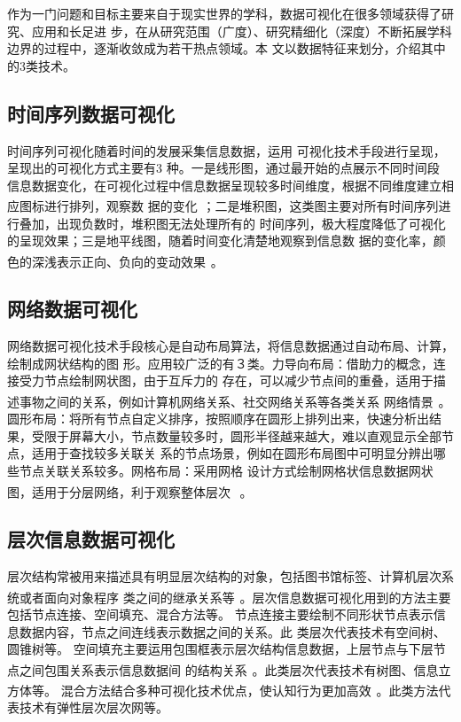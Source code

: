 \documentclass[a4paper]{article}
\begin{document}
作为一门问题和目标主要来自于现实世界的学科，数据可视化在很多领域获得了研究、应用和长足进
步，在从研究范围（广度）、研究精细化（深度）不断拓展学科边界的过程中，逐渐收敛成为若干热点领域。本
文以数据特征来划分，介绍其中的3类技术。
\subsection{时间序列数据可视化}
时间序列可视化随着时间的发展采集信息数据，运用
可视化技术手段进行呈现，呈现出的可视化方式主要有3
种。一是线形图，通过最开始的点展示不同时间段
信息数据变化，在可视化过程中信息数据呈现较多时间维度，根据不同维度建立相应图标进行排列，观察数
据的变化\textsuperscript{~\cite{chen2018embed}}；二是堆积图，这类图主要对所有时间序列进行叠加，出现负数时，堆积图无法处理所有的
时间序列，极大程度降低了可视化的呈现效果；三是地平线图，随着时间变化清楚地观察到信息数
据的变化率，颜色的深浅表示正向、负向的变动效果\textsuperscript{~\cite{ali2019timecluster,suh2019persistent}}。
\subsection{网络数据可视化}
网络数据可视化技术手段核心是自动布局算法，将信息数据通过自动布局、计算，绘制成网状结构的图
形。应用较广泛的有３类。力导向布局：借助力的概念，连接受力节点绘制网状图，由于互斥力的
存在，可以减少节点间的重叠，适用于描述事物之间的关系，例如计算机网络关系、社交网络关系等各类关系
网络情景\textsuperscript{~\cite{韩刘2020多元异构网络复杂多维数据可视化方法,王悦2020可视化指导下的图像领域深度学习模型优化方案设计}}。圆形布局：将所有节点自定义排序，按照顺序在圆形上排列出来，快速分析出结
果，受限于屏幕大小，节点数量较多时，圆形半径越来越大，难以直观显示全部节点，适用于查找较多关联关
系的节点场景，例如在圆形布局图中可明显分辨出哪些节点关联关系较多。网格布局：采用网格
设计方式绘制网格状信息数据网状图，适用于分层网络，利于观察整体层次
\textsuperscript{~\cite{田丰2019自然人机交互新进展专题前言}}。
\subsection{层次信息数据可视化}
层次结构常被用来描述具有明显层次结构的对象，包括图书馆标签、计算机层次系统或者面向对象程序
类之间的继承关系等\textsuperscript{~\cite{田宇荃2020海绵城市建设前后的可视化效果分析,陶芳2019网络舆论数据可视化技术研究}}。层次信息数据可视化用到的方法主要包括节点连接、空间填充、混合方法等。
节点连接主要绘制不同形状节点表示信息数据内容，节点之间连线表示数据之间的关系。此
类层次代表技术有空间树、圆锥树等。
空间填充主要运用包围框表示层次结构信息数据，上层节点与下层节点之间包围关系表示信息数据间
的结构关系\textsuperscript{~\cite{张甜甜2020一种基于数独分组的拉丁超立方试验设计方法}}。此类层次代表技术有树图、信息立方体等。
混合方法结合多种可视化技术优点，使认知行为更加高效\textsuperscript{~\cite{zhang2021interactive}}。此类方法代表技术有弹性层次层次网等。
\end{document}
